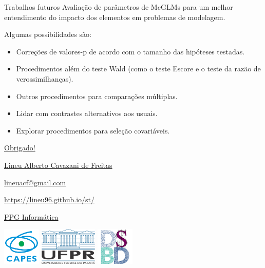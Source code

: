 \documentclass[
  ignorenonframetext,
  serif,
  professionalfont,
  usenames,
  dvipsnames,
  aspectratio = 169]{beamer}
\newif\ifbibliography
\begin{document}
\begin{frame}{Trabalhos futuros}
\protect\hypertarget{trabalhos-futuros}{}
Avaliação de parâmetros de McGLMs para um melhor entendimento do impacto
dos elementos em problemas de modelagem.

Algumas possibilidades são:

\begin{itemize}
  \item Correções de valores-p de acordo com o tamanho das hipóteses testadas. 
  \item Procedimentos além do teste Wald (como o teste Escore e o teste da razão de verossimilhanças). 
  \item Outros procedimentos para comparações múltiplas. 
  \item Lidar com contrastes alternativos aos usuais. 
  \item Explorar procedimentos para seleção covariáveis.
\end{itemize}
\end{frame}

\begin{frame}{}
\protect\hypertarget{section-2}{}
\begin{center}

  {\huge \href{https://lineu96.github.io/st/}{Obrigado!}}
  
  \vspace{0.5cm}
    
  {\normalsize \href{https://lineu96.github.io/st/}{Lineu Alberto Cavazani de Freitas}}
  
  {\normalsize \href{https://lineu96.github.io/st/}{lineuacf@gmail.com}}
  
  {\normalsize \href{https://lineu96.github.io/st/}{https://lineu96.github.io/st/}}
  
  {\normalsize \href{http://www.prppg.ufpr.br/ppginformatica/?lang=pb}{PPG Informática}}

\end{center}

\begin{center}
  \includegraphics[height=1.8cm]{config/capes_tp2.png}\hspace{2em}
  \includegraphics[height=1.8cm]{config/ufpr-transparent-600px.png}\hspace{2em}
  \includegraphics[height=1.8cm]{config/dsbd-2x2-trans.png}
\end{center}
\end{frame}

\begin{frame}[allowframebreaks]{}
  \bibliographytrue
  
\end{frame}
\end{document}
